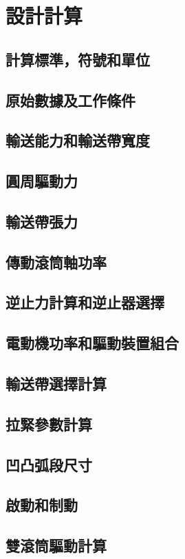 \documentclass[UTF8]{ctexart}
\begin{document}
\newpage
\section{設計計算}
\subsection{計算標準，符號和單位}
\subsection{原始數據及工作條件}
\subsection{輸送能力和輸送帶寬度}
\subsection{圓周驅動力}
\subsection{輸送帶張力}
\subsection{傳動滾筒軸功率}
\subsection{逆止力計算和逆止器選擇}
\subsection{電動機功率和驅動裝置組合}
\subsection{輸送帶選擇計算}
\subsection{拉緊參數計算}
\subsection{凹凸弧段尺寸}
\subsection{啟動和制動}
\subsection{雙滾筒驅動計算}
\end{document}
